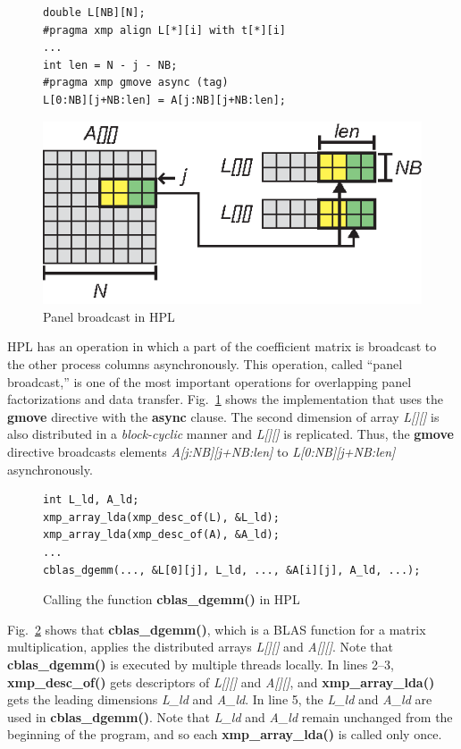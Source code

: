 \documentclass[graybox]{svmult}
\begin{document}
\begin{figure}[h]
    \begin{lstlisting}
double L[NB][N];
#pragma xmp align L[*][i] with t[*][i]
...
int len = N - j - NB;
#pragma xmp gmove async (tag)
L[0:NB][j+NB:len] = A[j:NB][j+NB:len];
    \end{lstlisting}
\sidecaption
    \includegraphics[scale=1.1,clip]{img/hpl-panel.eps}
    \caption{Panel broadcast in HPL\cite{hpca}}\label{fig:hpl-panel}
\end{figure}

HPL has an operation in which a part of the coefficient matrix is broadcast to the other process columns asynchronously.
This operation, called ``panel broadcast,'' is one of the most important operations for overlapping panel factorizations and data transfer.
Fig.~\ref{fig:hpl-panel} shows the implementation that uses the {\bf gmove} directive with the {\bf async} clause.
The second dimension of array {\it L[][]} is also distributed in a {\it block-cyclic} manner and {\it L[][]} is replicated.
Thus, the {\bf gmove} directive broadcasts elements {\it A[j:NB][j+NB:len]} to {\it L[0:NB][j+NB:len]} asynchronously.

\begin{figure}[h]
\begin{lstlisting}
int L_ld, A_ld;
xmp_array_lda(xmp_desc_of(L), &L_ld);
xmp_array_lda(xmp_desc_of(A), &A_ld);
...
cblas_dgemm(..., &L[0][j], L_ld, ..., &A[i][j], A_ld, ...);
\end{lstlisting}
\caption{Calling the function {\bf cblas\_dgemm()} in HPL\cite{hpca}}\label{fig:hpl-dgemm}
\end{figure}

Fig.~\ref{fig:hpl-dgemm} shows that {\bf cblas\_dgemm()}, which is a BLAS function for a matrix multiplication,
applies the distributed arrays {\it L[][]} and {\it A[][]}.
Note that {\bf cblas\_dgemm()} is executed by multiple threads locally.
In lines 2--3,
{\bf xmp\_desc\_of()} gets descriptors of {\it L[][]} and {\it A[][]}, and
{\bf xmp\_array\_lda()} gets the leading dimensions {\it L\_ld} and {\it A\_ld}.
In line 5,
the {\it L\_ld} and {\it A\_ld} are used in {\bf cblas\_dgemm()}.
Note that {\it L\_ld} and {\it A\_ld} remain unchanged from the beginning of the program,
and so each {\bf xmp\_array\_lda()} is called only once.
\end{document}
